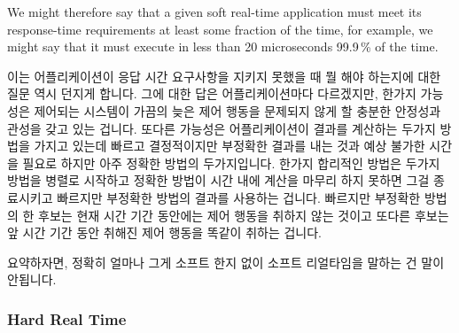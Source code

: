 We might therefore say that a given soft real-time application must meet
its response-time requirements at least some fraction of the time, for
example, we might say that it must execute in less than 20 microseconds
99.9\,\% of the time.

\fi

이는 어플리케이션이 응답 시간 요구사항을 지키지 못했을 때 뭘 해야 하는지에 대한
질문 역시 던지게 합니다.
그에 대한 답은 어플리케이션마다 다르겠지만, 한가지 가능성은 제어되는 시스템이
가끔의 늦은 제어 행동을 문제되지 않게 할 충분한 안정성과 관성을 갖고 있는
겁니다.
또다른 가능성은 어플리케이션이 결과를 계산하는 두가지 방법을 가지고 있는데
빠르고 결정적이지만 부정확한 결과를 내는 것과 예상 불가한 시간을 필요로 하지만
아주 정확한 방법의 두가지입니다.
한가지 합리적인 방법은 두가지 방법을 병렬로 시작하고 정확한 방법이 시간 내에
계산을 마무리 하지 못하면 그걸 종료시키고 빠르지만 부정확한 방법의 결과를
사용하는 겁니다.
빠르지만 부정확한 방법의 한 후보는 현재 시간 기간 동안에는 제어 행동을 취하지
않는 것이고 또다른 후보는 앞 시간 기간 동안 취해진 제어 행동을 똑같이 취하는
겁니다.

요약하자면, 정확히 얼마나 그게 소프트 한지 없이 소프트 리얼타임을 말하는 건
말이 안됩니다.

\subsubsection{Hard Real Time}
\label{sec:Hard Real Time}

